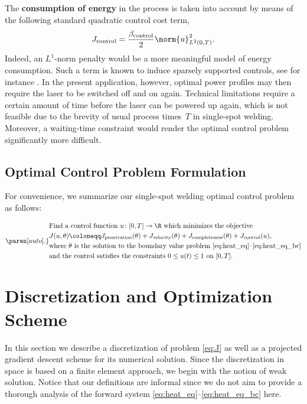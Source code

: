 The \textbf{consumption of energy} in the process is taken into account by means of the following standard quadratic control cost term,
\begin{equation}
	J_\textup{control} 
	=
	\frac{\beta_\textup{control}}{2} \norm{u}^2_{L^2(0,T)}
	.
\end{equation}
Indeed, an $L^1$-norm penalty would be a more meaningful model of energy consumption.
Such a term is known to induce sparsely supported controls, see for instance \cite{VossenMaurer:2006:1,Stadler:2009:1,CasasHerzogWachsmuth:2012:2}.
In the present application, however, optimal power profiles may then require the laser to be switched off and on again.
Technical limitations require a certain amount of time before the laser can be powered up again, which is not feasible due to the brevity of usual process times~$T$ in single-spot welding.
Moreover, a waiting-time constraint would render the optimal control problem significantly more difficult.


\subsection{Optimal Control Problem Formulation}

For convenience, we summarize our single-spot welding optimal control problem as follows:

\begin{equation} \label{eq:J}
	\paren[auto].\}{%
		\begin{aligned}
			&
			\text{Find a control function $u \colon [0,T] \to \R$ which minimizes the objective}
			\\
			&
			J(u,\theta) 
			\coloneqq 
			J_\textup{penetration}(\theta) + J_\textup{velocity}(\theta) + J_\textup{completeness}(\theta) + J_\textup{control}(u)
			,
			\\
			&
			\text{where $\theta$ is the solution to the boundary value problem \eqref{eq:heat_eq}--\eqref{eq:heat_eq_bc}}
			\\
			&
			\text{and the control satisfies the constraints $0 \le u(t) \le 1$ on $[0,T]$}
			.
		\end{aligned}
	}
\end{equation}


\section{Discretization and Optimization Scheme}
\label{sec:discretization}

In this section we describe a discretization of problem \eqref{eq:J} as well as a projected gradient descent scheme for its numerical solution.
Since the discretization in space is based on a finite element approach, we begin with the notion of weak solution.
Notice that our definitions are informal since we do not aim to provide a thorough analysis of the forward system \eqref{eq:heat_eq}--\eqref{eq:heat_eq_bc} here.


